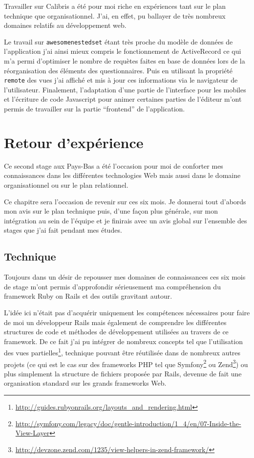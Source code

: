 \documentclass[12pt,a4paper]{book}
\begin{document}
Travailler sur Calibris a été pour moi riche en expériences tant sur le plan technique que organisationnel. J'ai, en effet, pu ballayer de très nombreux domaines relatifs au développement web. 

Le travail sur \texttt{awesomenestedset} étant très proche du modèle de données de l'application j'ai ainsi mieux compris le fonctionnement de ActiveRecord ce qui m'a permi d'optimiser le nombre de requètes faites en base de données lors de la réorganisation des éléments des questionnaires.
Puis en utilisant la propriété \texttt{remote} des vues j'ai affiché et mis à jour ces informations via le navigateur de l'utilisateur.
Finalement, l'adaptation d'une partie de l'interface pour les mobiles et l'écriture de code Javascript pour animer certaines parties de l'éditeur m'ont permis de travailler sur la partie ``frontend'' de l'application.

\chapter{Retour d'expérience}

Ce second stage aux Pays-Bas a été l'occasion pour moi de conforter mes connaissances dans les différentes technologies Web mais aussi dans le domaine organisationnel ou sur le plan relationnel.

Ce chapitre sera l'occasion de revenir sur ces six mois. Je donnerai tout d'abords mon avis sur le plan technique puis, d'une façon plus générale, sur mon intégration au sein de l'équipe et je finirais avec un avis global sur l'ensemble des stages que j'ai fait pendant mes études.

\section{Technique}

Toujours dans un désir de repousser mes domaines de connaissances ces six mois de stage m'ont permis d'approfondir sérieusement ma compréhension du framework Ruby on Rails et des outils gravitant autour.

L'idée ici n'était pas d'acquérir uniquement les compétences nécessaires pour faire de moi un développeur Rails mais également de comprendre les différentes structures de code et méthodes de développement utilisées au travers de ce framework. De ce fait j'ai pu intégrer de nombreux concepts tel que l'utilisation des vues partielles\footnote{\url{http://guides.rubyonrails.org/layouts_and_rendering.html}}, technique pouvant être réutilisée dans de nombreux autres projets (ce qui est le cas sur des frameworks PHP tel que Symfony\footnote{\url{http://symfony.com/legacy/doc/gentle-introduction/1_4/en/07-Inside-the-View-Layer}} ou Zend\footnote{\url{http://devzone.zend.com/1235/view-helpers-in-zend-framework/}}) ou plus simplement la structure de fichiers proposée par Rails, devenue de fait une organisation standard sur les grands frameworks Web.
\end{document}
